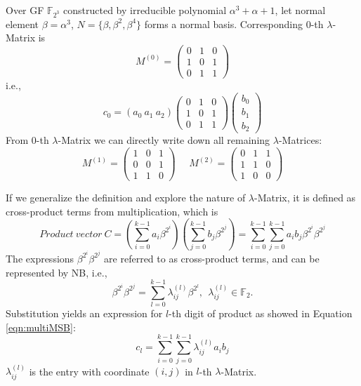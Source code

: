 \begin{Example}
Over GF $\mathbb F_{2^3}$ constructed by irreducible polynomial $\alpha^3 + \alpha + 1$, let normal element $\beta = \alpha^3$, $N = \{ \beta, \beta^2, \beta^4\}$ 
forms a normal basis. Corresponding $0$-th $\lambda$-Matrix is
\begin{equation*}
M^{(0)} = \left(
\begin{array} {lcr}
0 & 1 & 0\\
1 & 0 & 1\\
0 & 1 & 1
\end{array} \right)
\end{equation*}
i.e.,
\begin{equation*}
c_0 = (a_0\  a_1\  a_2)\left(
\begin{array} {lcr}
0 & 1 & 0\\
1 & 0 & 1\\
0 & 1 & 1
\end{array} \right)\left(
\begin{array} {lcr}
b_0\\
b_1\\
b_2
\end{array} \right)
\end{equation*}
From $0$-th $\lambda$-Matrix we can directly write down all remaining $\lambda$-Matrices:
\begin{equation*}
M^{(1)} = \left(
\begin{array} {lcr}
1 & 0 & 1\\
0 & 0 & 1\\
1 & 1 & 0
\end{array} \right)~~~~~~
M^{(2)} = \left(
\begin{array} {lcr}
0 & 1 & 1\\
1 & 1 & 0\\
1 & 0 & 0
\end{array} \right)
\end{equation*}
\end{Example}

If we generalize the definition and explore the nature of $\lambda$-Matrix, it is defined as cross-product terms from multiplication, which is 
\begin{equation}
Product~vector~C = (\sum_{i=0}^{k-1}a_i\beta^{2^i})(\sum_{j=0}^{k-1}b_j\beta^{2^j}) = \sum_{i=0}^{k-1}\sum_{j=0}^{k-1}a_ib_j\beta^{2^i}\beta^{2^j}
\end{equation}
The expressions $\beta^{2^i}\beta^{2^j}$ are referred to as cross-product terms, and can be represented by
NB, i.e.,
\begin{equation}
\beta^{2^i}\beta^{2^j} = \sum_{l=0}^{k-1}\lambda_{ij}^{(l)}\beta^{2^l}, \ \ \lambda_{ij}^{(l)} \in \mathbb F_2.
\end{equation}
Substitution yields an expression for $l$-th digit of product as showed in Equation \ref{eqn:multiMSB}:
\begin{equation}
c_l = \sum_{i=0}^{k-1}\sum_{j=0}^{k-1}\lambda_{ij}^{(l)}a_ib_j
\end{equation}
$\lambda_{ij}^{(l)}$ is the entry with coordinate $(i,j)$ in $l$-th $\lambda$-Matrix.

